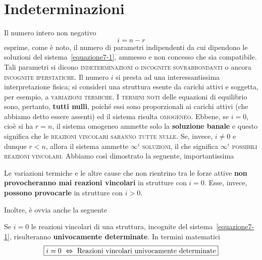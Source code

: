 \section{Indeterminazioni}
\noindent Il numero intero non negativo 
\begin{equation*}
\boxed{i = n-r}
\end{equation*}
\noindent esprime, come è noto, il numero di parametri indipendenti da cui dipendono le soluzioni del sistema~\eqref{equazione7-1}, ammesso e non concesso che sia compatibile. Tali parametri si dicono \textsc{indeterminazioni} o \textsc{incognite sovrabbondanti} o ancora \textsc{incognite iperstatiche}. Il numero $i$ si presta ad una interessantissima interpretazione fisica; si consideri una struttura esente da carichi attivi e soggetta, per esempio, a \textsc{variazioni termiche}. I \textsc{termini noti} delle equazioni di equilibrio sono, pertanto, \textbf{tutti nulli}, poiché essi sono proporzionali ai carichi attivi (che abbiamo detto essere assenti) ed il sistema risulta \textsc{omogeneo}. Ebbene, se $i=0$, cioè si ha $r=n$, il sistema omogeneo ammette solo la \textbf{soluzione banale} e questo significa che le \textsc{reazioni vincolari saranno tutte nulle}. Se, invece, $i\ne 0$ e dunque $r<n$, allora il sistema ammette $\infty^i$ \textsc{soluzioni}, il che significa $\infty^i$ \textsc{possibili reazioni vincolari}. Abbiamo così dimostrato la seguente, importantissima
\begin{prop}
Le variazioni termiche e le altre cause che non rientrino tra le forze attive \textbf{non provocheranno mai reazioni vincolari} in strutture con $i=0$. Esse, invece, \textbf{possono provocarle} in strutture con $i>0$. 
\end{prop}
\noindent Inoltre, è ovvia anche la seguente
\begin{prop}
Se $i=0$ le reazioni vincolari di una struttura, incognite del sistema~\eqref{equazione7-1}, risulteranno \textbf{univocamente determinate}. In termini matematici
\begin{equation*}
\boxed{i=0 \,\,\Leftrightarrow\,\, \textup{Reazioni vincolari univocamente determinate}}
\end{equation*}
\end{prop}

